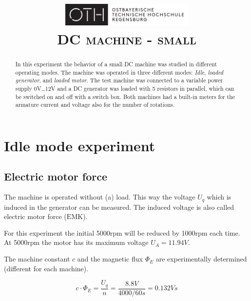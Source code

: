 \documentclass[conference]{IEEEtran}
\author{
    \IEEEauthorblockN{
        \textsc{Ayham Alhalaibi}
    }
    \and
    \IEEEauthorblockN{
        \textsc{Julia Blechle}
    }
    \and
    \IEEEauthorblockN{
        \textsc{Clara Huber}
    }
}
\begin{document}
\title{
    \centering
    \includegraphics[width=0.5\textwidth]{../OTHR_OTHR_Logo.pdf}\\
    \textsc{DC machine - small} \\
}

\maketitle

\begin{abstract}

    In this experiment the behavior of a small DC machine was studied in
    different operating modes. The machine was operated in three different
    modes: \textit{Idle}, \textit{loaded generator}, and \textit{loaded motor}.
    The test machine was connected to a variable power supply
    0\si{V}\dots12\si{V} and a DC generator was loaded with 5 resistors in
    parallel, which can be switched on and off with a switch box. Both machines
    had a built-in meters for the armature current and voltage also for the
    number of rotations.

\end{abstract}

\section{Idle mode experiment}
\subsection{Electric motor force}

The machine is operated without (a) load. This way the voltage $U_q$ which is
induced in the generator can be measured. The induced voltage is also called
electric motor force ($\mathrm{EMK}$).

For this experiment the initial 5000rpm will be reduced by 1000rpm each
time. At 5000rpm the motor has its maximum voltage $U_A = 11.94V$.

The machine constant $c$ and the magnetic flux $\Phi_E$ are experimentally
determined (different for each machine).

\begin{equation} \label{eq:machine_const}
    c \cdot \Phi_E = \frac{U_q}{n} = \frac{8.8\si{V}}{4000/60\si{s}} = 0.132\si{Vs}
\end{equation}
\end{document}
